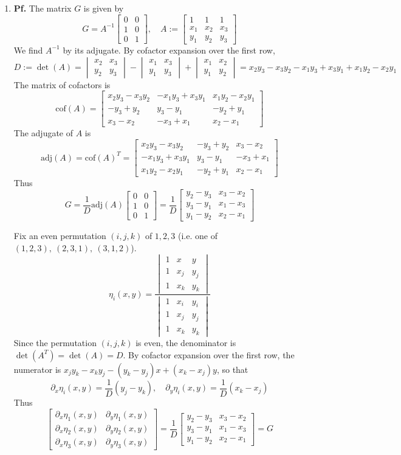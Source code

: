 \documentclass{article}
\def\tbf#1{\textbf{#1}}
\newcommand{\m}[2][b]{\begin{#1matrix}#2\end{#1matrix}}
\newcommand{\inv}{^{-1}}
\newcommand{\pf}{\tbf{Pf. }}
\newcommand{\ptl}{\partial}
\begin{document}
\begin{enumerate}[label=(\alph*)]
	
\item \pf The matrix $G$ is given by
$$G = A\inv \m{0 & 0 \\ 1 & 0 \\ 0 & 1},
\quad A := \m{1 & 1 & 1 \\ x_1 & x_2 & x_3 \\ y_1 & y_2 & y_3}$$
We find $A\inv$ by its adjugate. By cofactor expansion over the first row,
$$D := \det(A)
= \m[v]{x_2 & x_3 \\ y_2 & y_3} - \m[v]{x_1 & x_3 \\ y_1 & y_3} + \m[v]{x_1 & x_2 \\ y_1 & y_2}
= x_2y_3 - x_3y_2 - x_1y_3 + x_3y_1 + x_1y_2 - x_2y_1$$
The matrix of cofactors is
$$\mathrm{cof}(A) = \m{x_2y_3-x_3y_2 & -x_1y_3+x_3y_1 & x_1y_2-x_2y_1 \\ -y_3+y_2 & y_3-y_1 & -y_2+y_1 \\ x_3-x_2 & -x_3+x_1 & x_2-x_1}$$
The adjugate of $A$ is
$$\mathrm{adj}(A) = \mathrm{cof}(A)^T
= \m{x_2y_3-x_3y_2 & -y_3+y_2  & x_3-x_2 \\ -x_1y_3+x_3y_1& y_3-y_1 & -x_3+x_1 \\ x_1y_2-x_2y_1 & -y_2+y_1 & x_2-x_1}$$
Thus
$$G = \frac{1}{D}\mathrm{adj}(A)\m{0 & 0 \\ 1 & 0 \\ 0 & 1}
= \frac{1}{D}\m{y_2-y_3 & x_3-x_2 \\ y_3-y_1 & x_1-x_3 \\ y_1-y_2 & x_2-x_1}$$

Fix an even permutation $(i,j,k)$ of $1,2,3$ (i.e. one of $(1,2,3),~(2,3,1),~(3,1,2)$).
$$\eta_i(x,y) = \frac{\m[v]{1 & x & y \\ 1 & x_j & y_j \\ 1 & x_k & y_k}}{\m[v]{1 & x_i & y_i \\ 1 & x_j & y_j \\ 1 & x_k & y_k}}$$
Since the permutation $(i,j,k)$ is even, the denominator is $\det(A^T)=\det(A)=D$. By cofactor expansion over the first row, the numerator is $x_jy_k - x_ky_j - (y_k - y_j)x + (x_k - x_j)y$, so that
$$\ptl_x\eta_i(x,y) = \frac{1}{D}(y_j-y_k),
\quad \ptl_y\eta_i(x,y) = \frac{1}{D}(x_k-x_j)$$
Thus
$$\m{\ptl_x\eta_1(x,y) & \ptl_y\eta_1(x,y) \\ \ptl_x\eta_2(x,y) & \ptl_y\eta_2(x,y) \\ \ptl_x\eta_3(x,y) & \ptl_y\eta_3(x,y)}
= \frac{1}{D}\m{y_2-y_3 & x_3-x_2 \\ y_3-y_1 & x_1-x_3 \\ y_1-y_2 & x_2-x_1}
= G$$



\end{enumerate}
\end{document}
